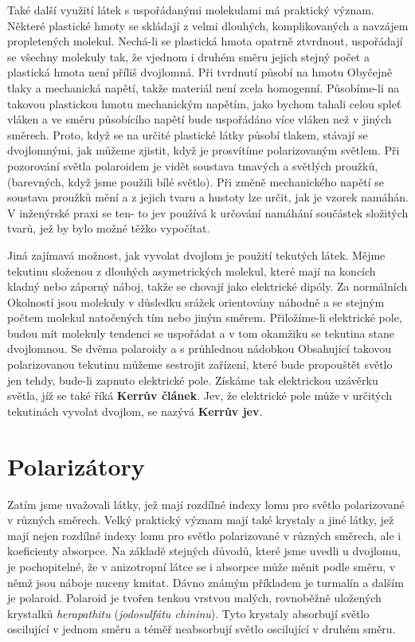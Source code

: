     Také další využití látek s uspořádanými molekulami má praktický význam. Některé plastické hmoty
    se skládají z velmi dlouhých, komplikovaných a navzájem propletených molekul. Nechá-li se
    plastická hmota opatrně ztvrdnout, uspořádají se všechny molekuly tak, že vjednom i druhém směru
    jejich stejný počet a plastická hmota není příliš dvojlomná. Při tvrdnutí působí na hmotu
    Obyčejně tlaky a mechanická napětí, takže materiál není zcela homogenní. Působíme-li na takovou
    plastickou hmotu mechanickým napětím, jako bychom tahali celou spleť vláken a ve směru
    působícího napětí bude uspořádáno více vláken než v jiných směrech. Proto, když se na určité
    plastické látky působí tlakem, stávají se dvojlomnými, jak můžeme zjistit, když je prosvítíme
    polarizovaným světlem. Při pozorování světla polaroidem je vidět soustava tmavých a světlých
    proužků, (barevných, když jsme použili bílé světlo). Při změně mechanického napětí se soustava
    proužků mění a z jejich tvaru a hustoty lze určit, jak je vzorek namáhán. V inženýrské praxi se
    ten- to jev používá k určování namáhání součástek složitých tvarů, jež by bylo možné těžko
    vypočítat.

    Jiná zajímavá možnost, jak vyvolat dvojlom je použití tekutých látek. Mějme tekutinu složenou z
    dlouhých asymetrických molekul, které mají na koncích kladný nebo záporný náboj, takže se
    chovají jako elektrické dipóly. Za normálních Okolností jsou molekuly v důsledku srážek
    orientovány náhodně a se stejným počtem molekul natočených tím nebo jiným směrem. Přiložíme-li
    elektrické pole, budou mít molekuly tendenci se uspořádat a v tom okamžiku se tekutina stane
    dvojlomnou. Se dvěma polaroidy a s průhlednou nádobkou Obsahující takovou polarizovanou tekutinu
    můžeme sestrojit zařízení, které bude propouštět světlo jen tehdy, bude-li zapnuto elektrické
    pole. Získáme tak elektrickou uzávěrku světla, jíž se také říká \textbf{Kerrův článek}.  Jev, že
    elektrické pole může v určitých tekutinách vyvolat dvojlom, se nazývá \textbf{Kerrův jev}.
  
  \section{Polarizátory}\label{fyz:IchapXXXIIIsecIV}
    Zatím jsme uvažovali látky, jež mají rozdílné indexy lomu pro světlo polarizované v různých
    směrech. Velký praktický význam mají také krystaly a jiné látky, jež mají nejen rozdílné indexy
    lomu pro světlo polarizované v různých směrech, ale i koeﬁcienty absorpce. Na základě stejných
    důvodů, které jsme uvedli u dvojlomu, je pochopitelné, že v anizotropní látce se i absorpce může
    měnit podle směru, v němž jsou náboje nuceny kmitat. Dávno známým příkladem je turmalín a dalším
    je polaroid. Polaroid je tvořen tenkou vrstvou malých, rovnoběžně uložených krystalků
    \emph{herapathitu} (\emph{jodosulfátu chininu}). Tyto krystaly absorbují světlo oscilující v
    jednom směru a téměř neabsorbují světlo oscilující v druhém směru.
  
